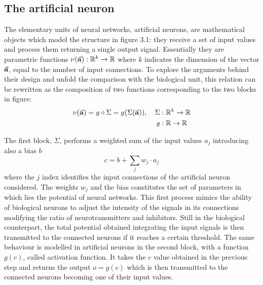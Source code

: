 \documentclass[a4paper,10pt]{report}
\begin{document}
\subsection{The artificial neuron}

The elementary units of neural networks, artificial neurons, are mathematical objects
which model the structure in figure 3.1: they receive a set of input values
and process them returning a single output signal.
Essentially they are parametric functions $\nu(\va a): \mathbb R ^k \rightarrow \mathbb R$ 
where $k$ indicates the dimension of the vector $\va a$, equal to the number of input connections.
To explore the arguments behind their design and unfold the
comparison with the biological unit, this relation can be rewritten 
as the composition of two functions corresponding to the two blocks in figure:
\begin{align}
    \nu (\va a) = g \circ \Sigma = g(\Sigma (\va a)), \hspace{10pt}
    \Sigma &: \mathbb R^k \rightarrow \mathbb R \\
    g &: \mathbb R \rightarrow \mathbb R \nonumber
\end{align}

The first block, $\Sigma$, performs a weighted sum of the input values $a_{j}$ introducing also a bias $b$
\begin{equation}
   c = b + \sum_j w_{j} \cdot a_{j} 
\end{equation}
where the $j$ index identifies the input connections of the artificial neuron considered.
The weights $w_{j}$ and the bias constitutes the set of parameters in which
lies the potential of neural networks.
This first process mimics the ability of biological neurons to adjust the intensity of the signals in its connections
modifying the ratio of neurotransmitters and inhibitors.
Still in the biological counterpart, the total potential obtained integrating the input signals is then transmitted to the 
connected neurons if it reaches a certain threshold.
The same behaviour is modelled in artificial neurons in the second block, 
with a function $g(c)$, called activation function. It takes the $c$ value obtained in the
previous step and returns the output $o = g(c)$ which is then transmitted to the connected neurons 
becoming one of their input values.
\end{document}
